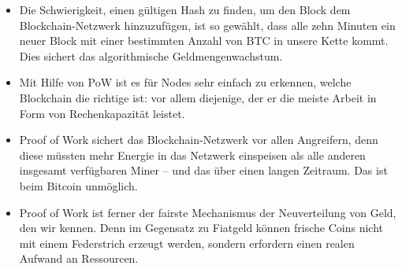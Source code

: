 \documentclass[ngerman]{scrreprt}
\begin{document}
\begin{itemize}
	\item{Die Schwierigkeit, einen gültigen Hash zu finden, um den Block dem Blockchain-Netzwerk hinzuzufügen, ist so gewählt, dass alle zehn Minuten ein neuer Block mit einer bestimmten Anzahl von BTC in unsere Kette kommt.
		Dies sichert das algorithmische Geldmengenwachstum.}
	\item{Mit Hilfe von PoW ist es für Nodes sehr einfach zu erkennen, welche Blockchain die richtige ist: vor allem diejenige, der er die meiste Arbeit in Form von Rechenkapazität leistet.}
	\item{Proof of Work sichert das Blockchain-Netzwerk vor allen Angreifern, denn diese müssten mehr Energie in das Netzwerk einspeisen als alle anderen insgesamt verfügbaren Miner – und das über einen langen Zeitraum. Das ist beim Bitcoin unmöglich.}
	\item{Proof of Work ist ferner der fairste Mechanismus der Neuverteilung von Geld, den wir kennen. Denn im Gegensatz zu Fiatgeld können frische Coins nicht mit einem Federstrich erzeugt werden, sondern erfordern einen realen Aufwand an Ressourcen.}
\end{itemize}
\end{document}
